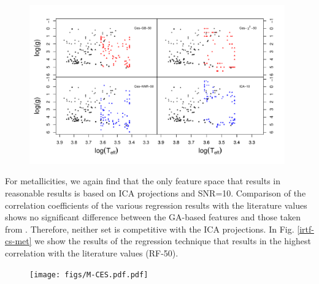 
\begin {figure}
 \centering
  \includegraphics[width=11cm]{figs/irtf-Cesseti.pdf}
  \caption{}
 \label{fig:irtf-ces}
\end {figure}
 
 
For metallicities, we again find that the only feature space that results in reasonable results is based on ICA projections and SNR=10. Comparison of the correlation coefficients of the various regression results with the literature values shows no significant difference between the GA-based features and those taken from \cite{cesetti}. Therefore, neither set is competitive with the ICA projections. In Fig. \ref{irtf-cs-met} we show the results of the regression technique that results in the highest correlation with the literature values (RF-50).  

\begin {figure}
\centering
\texttt{[image: figs/M-CES.pdf.pdf]}
\caption{}
\label{fig:irtf-ces-met}
\end {figure}
